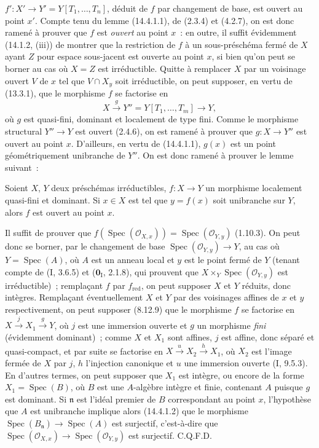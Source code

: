 
$f':X'\to Y'=Y[T_1,\ldots,T_n]$, déduit de $f$ par changement de base, est ouvert
au point $x'$. Compte tenu du lemme (14.4.1.1), de (2.3.4) et (4.2.7), on est donc
ramené à prouver que $f$ est \emph{ouvert} au point $x$~: en outre, il suffit
évidemment (14.1.2, (iii)) de montrer que la restriction de $f$ à un
sous-préschéma fermé de $X$ ayant $Z$ pour espace sous-jacent est ouverte au point
$x$, si bien qu'on peut se borner au cas où $X=Z$ est irréductible. Quitte à
remplacer $X$ par un voisinage ouvert $V$ de $x$ tel que $V\cap X_y$ soit
irréductible, on peut supposer, en vertu de (13.3.1), que le morphisme $f$ se
factorise en
\[
  X\xrightarrow{g}Y''=Y[T_1,\ldots,T_m]\to Y,
\]
où $g$ est quasi-fini, dominant et localement de type fini. Comme le morphisme
structural $Y''\to Y$ est ouvert (2.4.6), on est ramené à prouver que $g:X\to Y''$
est ouvert au point $x$. D'ailleurs, en vertu de (14.4.1.1), $g(x)$ est un point
géométriquement unibranche de $Y''$. On est donc ramené à prouver le lemme suivant~:

\begin{lemma}[14.4.1.3]
\label{IV.14.4.1.3-fr}
Soient $X$, $Y$ deux préschémas irréductibles, $f:X\to Y$ un morphisme localement
quasi-fini et dominant. Si $x\in X$ est tel que $y=f(x)$ soit unibranche sur $Y$,
alors $f$ est ouvert au point $x$.
\end{lemma}

Il suffit de prouver que
$f(\operatorname{Spec}(\mathcal O_{X,x}))=\operatorname{Spec}(\mathcal O_{Y,y})$
(1.10.3). On peut donc se borner, par le changement de base
$\operatorname{Spec}(\mathcal O_{Y,y})\to Y$, au cas où $Y=\operatorname{Spec}(A)$,
où $A$ est un anneau local et $y$ est le point fermé de $Y$ (tenant compte de
(I, 3.6.5) et ($\mathbf{0}_{\mathrm I}$, 2.1.8), qui prouvent que
$X\times_Y\operatorname{Spec}(\mathcal O_{Y,y})$ est irréductible)~; remplaçant $f$
par $f_{\mathrm{red}}$, on peut supposer $X$ et $Y$ réduits, donc intègres.
Remplaçant éventuellement $X$ et $Y$ par des voisinages affines de $x$ et $y$
respectivement, on peut supposer (8.12.9) que le morphisme $f$ se factorise en
$X\xrightarrow{j}X_1\xrightarrow{g}Y$, où $j$ est une immersion ouverte et $g$ un
morphisme \emph{fini} (évidemment dominant)~; comme $X$ et $X_1$ sont affines, $j$
est affine, donc séparé et quasi-compact, et par suite se factorise en
$X\xrightarrow{u}X_2\xrightarrow{h}X_1$, où $X_2$ est l'image fermée de $X$ par
$j$, $h$ l'injection canonique et $u$ une immersion ouverte (I, 9.5.3). En d'autres
termes, on peut supposer que $X_1$ est intègre, ou encore de la forme
$X_1=\operatorname{Spec}(B)$, où $B$ est une $A$-algèbre intègre et finie, contenant
$A$ puisque $g$ est dominant. Si $\mathfrak n$ est l'idéal premier de $B$
correspondant au point $x$, l'hypothèse que $A$ est unibranche implique alors
(14.4.1.2) que le morphisme
$\operatorname{Spec}(B_{\mathfrak n})\to\operatorname{Spec}(A)$ est surjectif,
c'est-à-dire que
$\operatorname{Spec}(\mathcal O_{X,x})\to\operatorname{Spec}(\mathcal O_{Y,y})$
est surjectif. C.Q.F.D.


